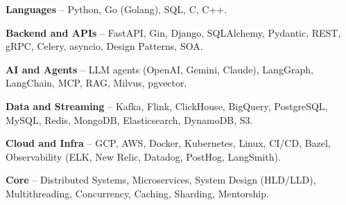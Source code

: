 \begin{zitemize}
\item \textbf{Languages} -- Python, Go (Golang), SQL, C, C++.
\item \textbf{Backend and APIs} -- FastAPI, Gin, Django, SQLAlchemy, Pydantic, REST, gRPC, Celery, asyncio, Design Patterns, SOA.
\item \textbf{AI and Agents} -- LLM agents (OpenAI, Gemini, Claude), LangGraph, LangChain, MCP, RAG, Milvus, pgvector.
\item \textbf{Data and Streaming} -- Kafka, Flink, ClickHouse, BigQuery, PostgreSQL, MySQL, Redis, MongoDB, Elasticsearch, DynamoDB, S3.
\item \textbf{Cloud and Infra} -- GCP, AWS, Docker, Kubernetes, Linux, CI/CD, Bazel, Observability (ELK, New Relic, Datadog, PostHog, LangSmith).
\item \textbf{Core} -- Distributed Systems, Microservices, System Design (HLD/LLD), Multithreading, Concurrency, Caching, Sharding, Mentorship.
\end{zitemize}
